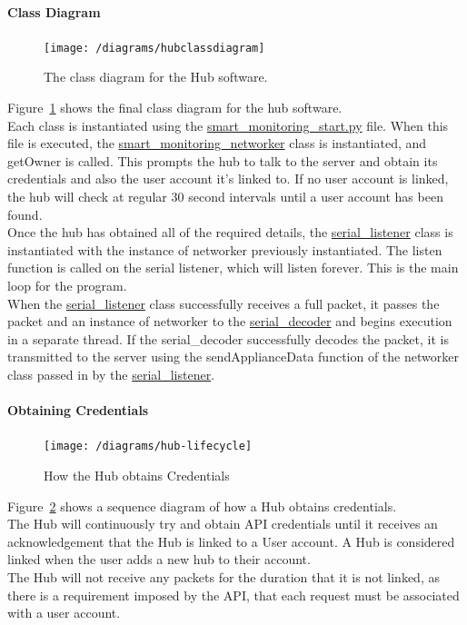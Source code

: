 \documentclass[preprint,12pt,3p]{elsarticle}
\begin{document}
\paragraph{Class Diagram}
\begin{figure}[H]
    \centering
    \texttt{[image: /diagrams/hubclassdiagram]}
    \caption{The class diagram for the Hub software.}
    \label{fig:hubclassdiagram}
\end{figure}
Figure~\ref{fig:hubclassdiagram} shows the final class diagram for the hub software.\\
Each class is instantiated using the \underline{smart\_monitoring\_start.py} file. When this file is executed, the \underline{smart\_monitoring\_networker} class is instantiated, and getOwner is called. This prompts the hub to talk to the server and obtain its credentials and also the user account it's linked to. If no user account is linked, the hub will check at regular 30 second intervals until a user account has been found.\\
Once the hub has obtained all of the required details, the \underline{serial\_listener} class is instantiated with the instance of networker previously instantiated. The listen function is called on the serial listener, which will listen forever. This is the main loop for the program.\\
When the \underline{serial\_listener} class successfully receives a full packet, it passes the packet and an instance of networker to the \underline{serial\_decoder} and begins execution in a separate thread. If the serial\_decoder successfully decodes the packet, it is transmitted to the server using the sendApplianceData function of the networker class passed in by the \underline{serial\_listener}.

\paragraph{Obtaining Credentials}

\begin{figure}[H]
    \centering
    \texttt{[image: /diagrams/hub-lifecycle]}
    \caption{How the Hub obtains Credentials}
    \label{fig:hublifecycle}
\end{figure}

Figure~\ref{fig:hublifecycle} shows a sequence diagram of how a Hub obtains credentials.\\
The Hub will continuously try and obtain API credentials until it receives an acknowledgement that the Hub is linked to a User account. A Hub is considered linked when the user adds a new hub to their account.\\
The Hub will not receive any packets for the duration that it is not linked, as there is a requirement imposed by the API, that each request must be associated with a user account.
\end{document}
